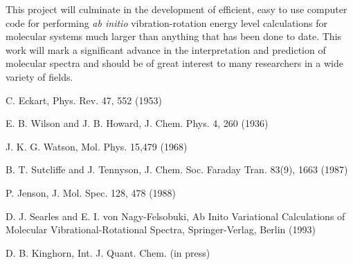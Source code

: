 \documentclass[12pt,thmsa]{article}
\begin{document}
This project will culminate in the development of efficient, easy to use
computer code for performing \emph{ab initio} vibration-rotation energy
level calculations for molecular systems much larger than anything that has
been done to date. This work will mark a significant advance in the
interpretation and prediction of molecular spectra and should be of great
interest to many researchers in a wide variety of fields.

\begin{thebibliography}{9}
  C. Eckart, Phys. Rev. 47, 552 (1953)

  E. B. Wilson and J. B. Howard, J. Chem. Phys. 4,
260 (1936)

  J. K. G. Watson, Mol. Phys. 15,479 (1968)

  B. T. Sutcliffe and J. Tennyson, J. Chem.
Soc. Faraday Tran. 83(9), 1663 (1987)

  P. Jenson, J. Mol. Spec. 128, 478 (1988)

  D. J. Searles and E. I. von Nagy-Felsobuki, Ab Inito
Variational Calculations of Molecular Vibrational-Rotational Spectra,
Springer-Verlag, Berlin (1993)

  D. B. Kinghorn, Int. J. Quant. Chem. (in press)
\end{thebibliography}
\end{document}
